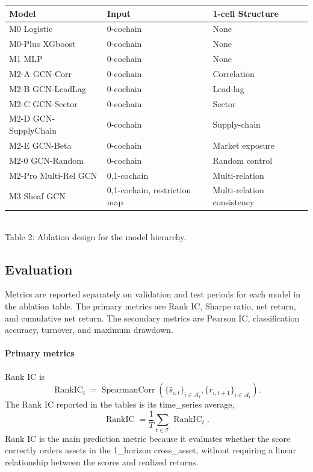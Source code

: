 \documentclass[11pt]{article}
\begin{document}
\begin{center}
\begin{tabular}{lll}
\toprule
\textbf{Model} & \textbf{Input} & \textbf{1-cell Structure} \\
\midrule
M0 Logistic
    & 0-cochain 
    & None \\
M0-Plus XGboost& 0-cochain & None\\
M1 MLP
    & 0-cochain 
    & None \\
M2-A GCN-Corr
    & 0-cochain 
    & Correlation  \\
M2-B GCN-LeadLag
    & 0-cochain 
    & Lead-lag  \\
M2-C GCN-Sector
    & 0-cochain 
    & Sector  \\
M2-D GCN-SupplyChain
    & 0-cochain 
    & Supply-chain\\
M2-E GCN-Beta
    & 0-cochain 
    & Market exposure\\
M2-0 GCN-Random
    & 0-cochain 
    & Random  control \\
M2-Pro Multi-Rel GCN
    & 0,1-cochain
    & Multi-relation  \\
M3 Sheaf GCN
    & 0,1-cochain, restriction map
    & Multi-relation consistency\\
\bottomrule
\end{tabular}
\smallskip\\
Table 2: Ablation design for the model hierarchy.
\end{center}


\subsection{Evaluation}

Metrics are reported separately on validation and test periods for each model in the ablation table. The primary metrics are Rank IC, Sharpe ratio, net return, and cumulative net return. The secondary metrics are Pearson IC, classification accuracy, turnover, and maximum drawdown.


\paragraph{Primary metrics}
Rank IC is
\[
    \operatorname{RankIC}_t
    =
    \operatorname{SpearmanCorr}
    \left(
        \{\hat{s}_{i,t}\}_{i \in \mathcal A_t},
        \{r_{i,t+1}\}_{i \in \mathcal A_t}
    \right).
\]
The Rank IC reported in the tables is its time\_series average, \[\overline{\operatorname{RankIC}} = \frac{1}{T} \sum_{t\in \mathcal T} \operatorname{RankIC}_t.\]
Rank IC is the main prediction metric because it evaluates whether the score correctly orders assets in the 1\_horizon cross\_asset,  without requiring a linear relationship between the scores and realized returns. 
\end{document}
